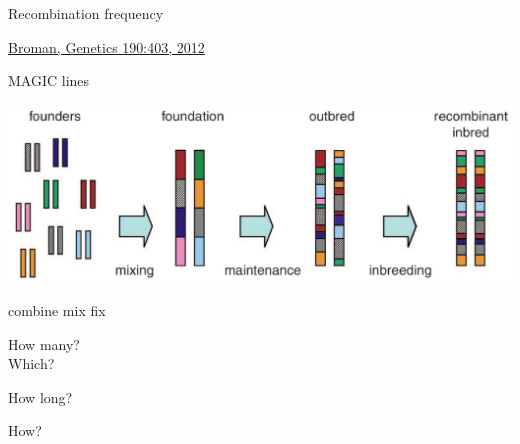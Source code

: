 \documentclass[12pt]{article}
\newcommand{\headsize}{\fontsize{35}{35} \selectfont}
\newcommand{\smallsize}{\fontsize{25}{30} \selectfont}
\newcommand{\smallersize}{\fontsize{20}{25} \selectfont}
\newcommand{\smallestsize}{\fontsize{18}{22} \selectfont}
\begin{document}
\vspace*{5mm}



\newpage

\headsize \color{myyellow}
\hfill \begin{minipage}{5.75in}
\centering
Recombination frequency
\end{minipage}

\vfill

\hfill {\smallestsize \color{myblue} \href{http://www.genetics.org/content/190/2/403.full}{Broman, Genetics
190:403, 2012}}

\vspace*{5mm}



\newpage


\headsize \color{myyellow}
\hfill \begin{minipage}{5.75in}
\centering
MAGIC lines
\end{minipage}

\vspace{20mm}

\centerline{\includegraphics[width=10in]{Figs/valdar_genet2006.png}}

\smallsize \color{myyellow}
\hspace*{52mm} combine \hspace*{35mm} mix \hspace*{52mm} fix

\smallersize
\color{mywhite}
\vspace{20pt}

\hspace*{6mm}
\begin{minipage}[t]{45mm}
\vspace*{0mm}
\centering

How many? \\[20pt]
Which?
\end{minipage}
\hspace{57mm}
\begin{minipage}[t]{45mm}
\vspace*{0mm}
\centering

How long?
\end{minipage}
\hspace{18mm}
\begin{minipage}[t]{45mm}
\vspace*{0mm}
\centering

How?
\end{minipage}
\end{document}
